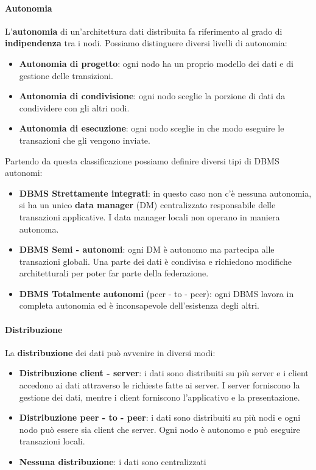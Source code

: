 \paragraph{Autonomia} L'\textbf{autonomia} di un'architettura dati distribuita
fa riferimento al grado di \textbf{indipendenza} tra i nodi. Possiamo distinguere
diversi livelli di autonomia:
\begin{itemize}
      \item \textbf{Autonomia di progetto}: ogni nodo ha un proprio modello dei
            dati e di gestione delle transizioni.
      \item \textbf{Autonomia di condivisione}: ogni nodo sceglie la porzione di
            dati da condividere con gli altri nodi.
      \item \textbf{Autonomia di esecuzione}: ogni nodo sceglie in che modo eseguire
            le transazioni che gli vengono inviate.
\end{itemize}
Partendo da questa classificazione possiamo definire diversi tipi di DBMS autonomi:
\begin{itemize}
      \item \textbf{DBMS Strettamente integrati}: in questo caso non c'è nessuna
            autonomia, si ha un unico \textbf{data manager} (DM) centralizzato
            responsabile delle transazioni applicative. I data
            manager locali non operano in maniera autonoma.
      \item \textbf{DBMS Semi - autonomi}: ogni DM è autonomo ma partecipa
            alle transazioni globali. Una parte dei dati è condivisa e richiedono
            modifiche architetturali per poter far parte della federazione.
      \item \textbf{DBMS Totalmente autonomi} (peer - to - peer): ogni DBMS lavora in
            completa autonomia ed è inconsapevole dell'esistenza degli altri.
\end{itemize}
\paragraph{Distribuzione} La \textbf{distribuzione} dei dati può avvenire in diversi
modi:
\begin{itemize}
      \item \textbf{Distribuzione client - server}: i dati sono distribuiti su più server
            e i client accedono ai dati attraverso le richieste fatte ai server.
            I server forniscono la gestione dei dati, mentre i client forniscono
            l'applicativo e la presentazione.
      \item \textbf{Distribuzione peer - to - peer}: i dati sono distribuiti su più nodi
            e ogni nodo può essere sia client che server. Ogni nodo è autonomo
            e può eseguire transazioni locali.
      \item \textbf{Nessuna distribuzione}: i dati sono centralizzati
\end{itemize}
